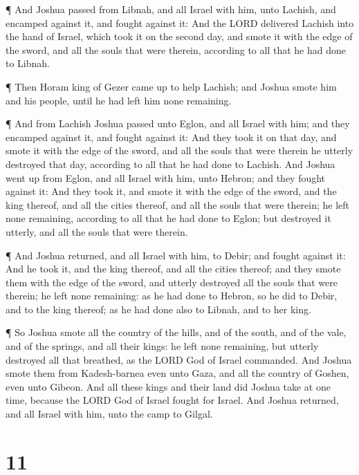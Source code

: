  ¶ And Joshua passed from Libnah, and all Israel with him,
unto Lachish, and encamped against it, and fought against it:
 And the LORD delivered Lachish into the hand of Israel,
which took it on the second day, and smote it with the edge of the
sword, and all the souls that were therein, according to all that he had
done to Libnah.

 ¶ Then Horam king of Gezer came up to help Lachish; and
Joshua smote him and his people, until he had left him none remaining.

 ¶ And from Lachish Joshua passed unto Eglon, and all
Israel with him; and they encamped against it, and fought against it:
 And they took it on that day, and smote it with the edge
of the sword, and all the souls that were therein he utterly destroyed
that day, according to all that he had done to Lachish. 
And Joshua went up from Eglon, and all Israel with him, unto Hebron; and
they fought against it:  And they took it, and smote it
with the edge of the sword, and the king thereof, and all the cities
thereof, and all the souls that were therein; he left none remaining,
according to all that he had done to Eglon; but destroyed it utterly,
and all the souls that were therein.

 ¶ And Joshua returned, and all Israel with him, to Debir;
and fought against it:  And he took it, and the king
thereof, and all the cities thereof; and they smote them with the edge
of the sword, and utterly destroyed all the souls that were therein; he
left none remaining: as he had done to Hebron, so he did to Debir, and
to the king thereof; as he had done also to Libnah, and to her king.

 ¶ So Joshua smote all the country of the hills, and of the
south, and of the vale, and of the springs, and all their kings: he left
none remaining, but utterly destroyed all that breathed, as the LORD God
of Israel commanded.  And Joshua smote them from
Kadesh-barnea even unto Gaza, and all the country of Goshen, even unto
Gibeon.  And all these kings and their land did Joshua take
at one time, because the LORD God of Israel fought for Israel.
 And Joshua returned, and all Israel with him, unto the
camp to Gilgal.

\hypertarget{section-10}{%
\section{11}\label{section-10}}

